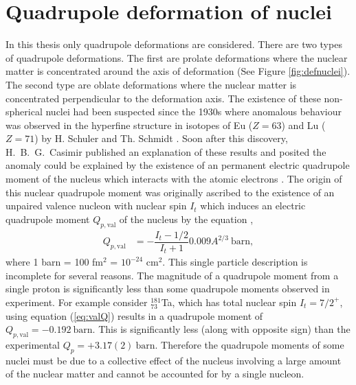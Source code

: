 \documentclass[10pt,a4paper, twoside, openright]{report}
\begin{document}
\section{Quadrupole deformation of nuclei} 
In this thesis only quadrupole deformations are considered. There are two types of quadrupole deformations. The first are prolate deformations where the nuclear matter is concentrated around the axis of deformation (See Figure \ref{fig:defnuclei}). The second type are oblate deformations where the nuclear matter is concentrated perpendicular to the deformation axis. The existence of these non-spherical nuclei had been suspected since the 1930s where anomalous behaviour was observed in the hyperfine structure in isotopes of Eu ($Z=63$) and Lu ($Z=71$) by H. Schuler and Th. Schmidt \cite{Schuler1935(1), Schuler1935(2)}. Soon after this discovery, H.~B.~G.~Casimir published an explanation of these results and posited the anomaly could be explained by the existence of an permanent electric quadrupole moment of the nucleus which interacts with the atomic electrons \cite{Casimir1935, Casimir1936}. The origin of this nuclear quadrupole moment was originally ascribed to the existence of an unpaired valence nucleon with nuclear spin $I_t$ which induces an electric quadrupole moment  $Q_{p,\text{val}}$ of the nucleus by the equation \cite{BohrMottVol1},
\begin{align}\label{eq:valQ}
Q_{p,\text{val}} &=  - \dfrac{I_t-1/2}{I_t + 1}0.009A^{2/3} \ \text{barn},
\end{align}  
where 1 barn = 100 fm$^2$ = $10^{-24}$ cm$^{2}$. This single particle description is incomplete for several reasons. The magnitude of a quadrupole moment from a single proton is significantly less than some quadrupole moments observed in experiment. For example consider $^{181}_{73}$Ta, which has total nuclear spin $I_t=7/2^{+}$, using equation (\ref{eq:valQ}) results in a quadrupole moment of $Q_{p,\text{val}} = -0.192 \ \text{barn}$. This is significantly less (along with opposite sign) than the experimental $Q_p = +3.17(2) \ \text{barn}$. Therefore the quadrupole moments of some nuclei must be due to a collective effect of the nucleus involving a large amount of the nuclear matter and cannot be accounted for by a single nucleon.\\
\linebreak
\end{document}
